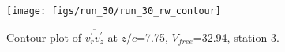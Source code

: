 \begin{figure}[H]
\centering
\texttt{[image: figs/run\_30/run\_30\_rw\_contour]}
\caption{Contour plot of $\overline{v_{r}^{\prime} v_{z}^{\prime}}$ at $z/c$=7.75, $V_{free}$=32.94, station 3.}
\label{fig:run_30_rw_contour}
\end{figure}


